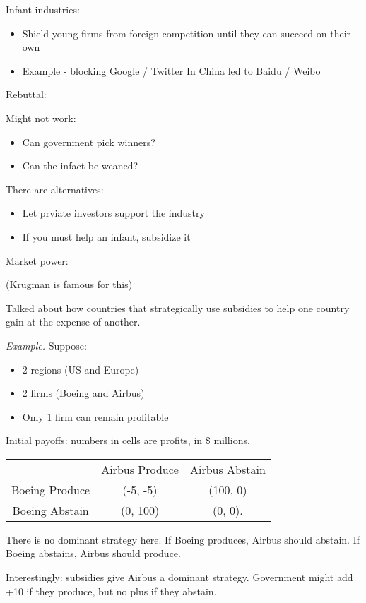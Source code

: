 \documentclass{article}
\begin{document}
Infant industries:

\begin{itemize}
  \item Shield young firms from foreign competition until they can succeed on their own
  \item Example - blocking Google / Twitter In China led to Baidu / Weibo
\end{itemize}

Rebuttal:

Might not work:
\begin{itemize}
  \item Can government pick winners?
  \item Can the infact be weaned?
\end{itemize}

There are alternatives:
\begin{itemize}
  \item Let prviate investors support the industry
  \item If you must help an infant, subsidize it
\end{itemize}

Market power:

(Krugman is famous for this)

Talked about how countries that strategically use subsidies to help one country gain at the expense of another.

{\it Example.} Suppose:

\begin{itemize}
  \item 2 regions (US and Europe)
  \item 2 firms (Boeing and Airbus)
  \item Only 1 firm can remain profitable
\end{itemize}

Initial payoffs: numbers in cells are profits, in \$ millions.

\begin{tabular}{|c|c|c|}
  & Airbus Produce & Airbus Abstain \\
  Boeing Produce & (-5, -5) & (100, 0) \\
  Boeing Abstain & (0, 100) & (0, 0).
\end{tabular}

There is no dominant strategy here.  If Boeing produces, Airbus should abstain.  If Boeing abstains, Airbus should produce.

Interestingly: subsidies give Airbus a dominant strategy.  Government might add +10 if they produce, but no plus if they abstain.
\end{document}
